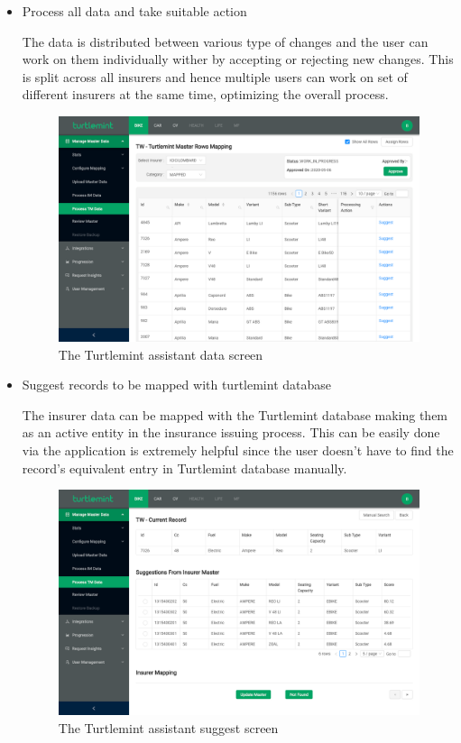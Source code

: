 \begin{itemize}
    \item Process all data and take suitable action

    The data is distributed between various type of changes and the user can
    work on them individually wither by accepting or rejecting new changes.
    This is split across all insurers and hence multiple users can work on
    set of different insurers at the same time, optimizing the overall process.
    \begin{figure}
        \includegraphics[width=\textwidth]{ch5/tap_data_work.png}
        \caption{The Turtlemint assistant data screen}
    \end{figure}

    \item Suggest records to be mapped with turtlemint database

    The insurer data can be mapped with the Turtlemint database making them
    as an active entity in the insurance issuing process. This can be easily
    done via the application is extremely helpful since the user doesn't have
    to find the record's equivalent entry in Turtlemint database manually.
    \begin{figure}
        \includegraphics[width=\textwidth]{ch5/tap_suggest.png}
        \caption{The Turtlemint assistant suggest screen}
    \end{figure}
\end{itemize}

